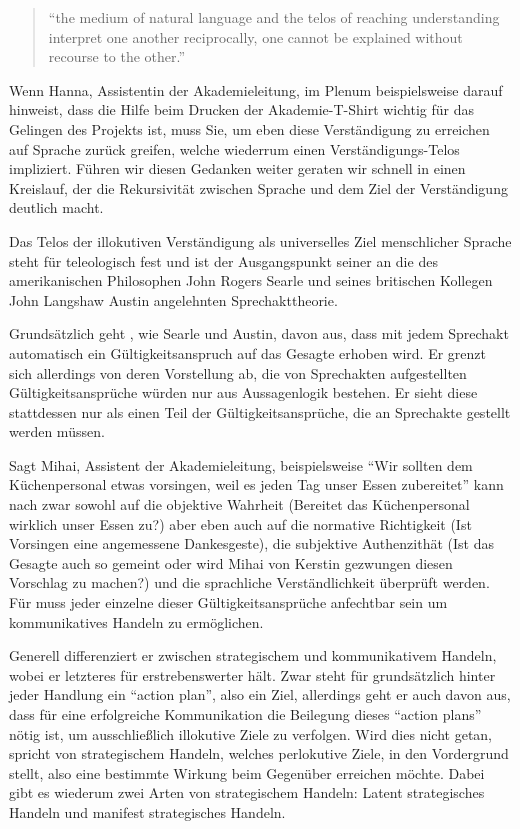 \begin{quote}
	``the medium of natural language and the telos of reaching understanding interpret one another reciprocally, one cannot be explained without recourse to the other.''
	\parencite[218]{Habermas-1998-aa}
\end{quote}

Wenn Hanna, Assistentin der Akademieleitung, im Plenum beispielsweise darauf hinweist, dass die Hilfe beim Drucken der Akademie-T-Shirt wichtig für das Gelingen des Projekts ist, muss Sie, um eben diese Verständigung zu erreichen auf Sprache zurück greifen, welche wiederrum einen Verständigungs-Telos impliziert.
Führen wir diesen Gedanken weiter geraten wir schnell in einen Kreislauf, der die Rekursivität zwischen Sprache und dem Ziel der Verständigung deutlich macht.

Das Telos der illokutiven Verständigung als universelles Ziel menschlicher Sprache steht für \citeauthor{Habermas-1998-aa} teleologisch fest und ist der Ausgangspunkt seiner an die des amerikanischen Philosophen John Rogers Searle und seines britischen Kollegen John Langshaw Austin angelehnten Sprechakttheorie.

Grundsätzlich geht \citeauthor{Habermas-1998-aa}, wie Searle und Austin, davon aus, dass mit jedem Sprechakt automatisch ein Gültigkeitsanspruch auf das Gesagte erhoben wird.
Er grenzt sich allerdings von deren Vorstellung ab, die von Sprechakten aufgestellten Gültigkeitsansprüche würden nur aus Aussagenlogik bestehen.
Er sieht diese stattdessen nur als einen Teil der Gültigkeitsansprüche, die an Sprechakte gestellt werden müssen.

Sagt Mihai, Assistent der Akademieleitung, beispielsweise ``Wir sollten dem Küchenpersonal etwas vorsingen, weil es jeden Tag unser Essen zubereitet'' kann nach \citeauthor{Habermas-1998-aa} zwar sowohl auf die objektive Wahrheit (Bereitet das Küchenpersonal wirklich unser Essen zu?) aber eben auch auf die normative Richtigkeit (Ist Vorsingen eine angemessene Dankesgeste), die subjektive Authenzithät (Ist das Gesagte auch so gemeint oder wird Mihai von Kerstin gezwungen diesen Vorschlag zu machen?) und die sprachliche Verständlichkeit überprüft werden.
Für \citeauthor{Habermas-1998-aa} muss jeder einzelne dieser Gültigkeitsansprüche anfechtbar sein um kommunikatives Handeln zu ermöglichen.

Generell differenziert er zwischen strategischem und kommunikativem Handeln, wobei er letzteres für erstrebenswerter hält.
Zwar steht für \citeauthor{Habermas-1998-aa} grundsätzlich hinter jeder Handlung ein ``action plan'', also ein Ziel, allerdings geht er auch davon aus, dass für eine erfolgreiche Kommunikation die Beilegung dieses ``action plans'' nötig ist, um ausschließlich illokutive Ziele zu verfolgen.
Wird dies nicht getan, spricht \citeauthor{Habermas-1998-aa} von strategischem Handeln, welches perlokutive Ziele, in den Vordergrund stellt, also eine bestimmte Wirkung beim Gegenüber erreichen möchte.
Dabei gibt es wiederum zwei Arten von strategischem Handeln:
Latent strategisches Handeln und manifest strategisches Handeln.

